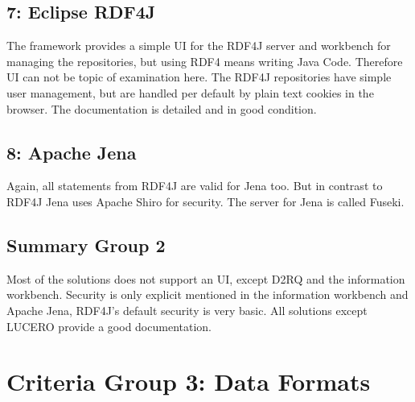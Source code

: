\subsection*{7: Eclipse RDF4J}
The framework provides a simple UI for the RDF4J server and workbench for managing 
the repositories, but using RDF4 means writing Java Code. Therefore UI can not be 
topic of examination here. The RDF4J repositories have simple user management, but 
are handled per default by plain text cookies in the browser. The documentation is 
detailed and in good condition.

\subsection*{8: Apache Jena}
Again, all statements from RDF4J are valid for Jena too. But in contrast to RDF4J 
Jena uses Apache Shiro for security. The server for Jena is called Fuseki.

\subsection{Summary Group 2}
Most of the solutions does not support an UI, except D2RQ and the information 
workbench. Security is only explicit mentioned in the information workbench and 
Apache Jena, RDF4J's default security is very basic. All solutions except LUCERO 
provide a good documentation.

\section{Criteria Group 3: Data Formats}

